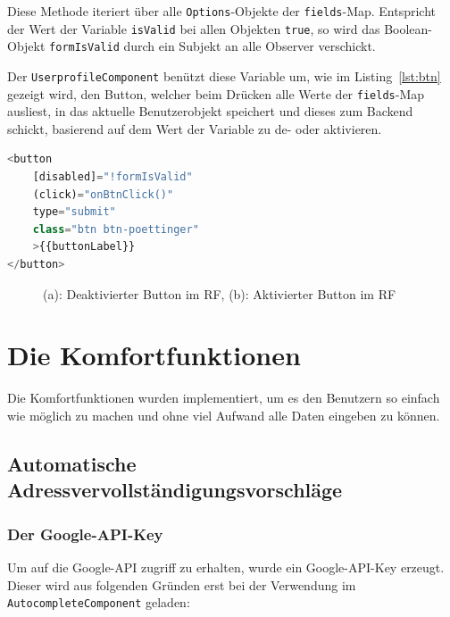 Diese Methode iteriert über alle \texttt{Options}-Objekte der \texttt{fields}-Map. Entspricht der Wert der Variable \texttt{isValid} bei allen Objekten \texttt{true}, so wird das Boolean-Objekt \texttt{formIsValid} durch ein Subjekt an alle Observer verschickt.

Der \texttt{UserprofileComponent} benützt diese Variable um, wie im Listing~\ref{lst:btn} gezeigt wird, den Button, welcher beim Drücken alle Werte der \texttt{fields}-Map ausliest, in das aktuelle Benutzerobjekt speichert und dieses zum Backend schickt, basierend auf dem Wert der Variable zu de- oder aktivieren.

\begin{lstlisting}[caption={Der Button im \texttt{UserprofileComponent}, welcher de- oder aktiviert wird}, language=JavaScript,label={lst:btn}]
<button 
	[disabled]="!formIsValid" 
	(click)="onBtnClick()" 
	type="submit"
	class="btn btn-poettinger"
	>{{buttonLabel}}
</button>
\end{lstlisting}

\begin{figure}[H]
	\centering
	\qquad
	\caption{(a): Deaktivierter Button im RF, (b): Aktivierter Button im RF}%
\end{figure}

\section{Die Komfortfunktionen}
Die Komfortfunktionen wurden implementiert, um es den Benutzern so einfach wie möglich zu machen und ohne viel Aufwand alle Daten eingeben zu können.
\subsection{Automatische Adressvervollständigungsvorschläge}
\subsubsection{Der Google-API-Key}
Um auf die Google-API zugriff zu erhalten, wurde ein Google-API-Key erzeugt. Dieser wird aus folgenden Gründen erst bei der Verwendung im \texttt{AutocompleteComponent} geladen:

